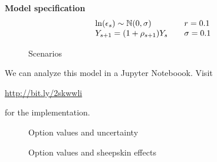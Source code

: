 \begin{frame}\textbf{Model specification}
\begin{align*}\begin{array}{l@{\qquad}l}
\ln(\epsilon_s) \sim \N(0, \sigma) & r = 0.1   \\
Y_{s + 1} = (1 + \rho_{s + 1}) Y_s & \sigma = 0.1 \\
\end{array}\end{align*}
\end{frame}
\begin{frame}
\begin{figure}[htp]\centering
\caption{Scenarios}
\end{figure}
\end{frame}
\begin{frame}
We can analyze this model in a Jupyter Noteboook. Visit
\begin{center}
\url{http://bit.ly/2skwwli}
\end{center}
for the implementation.
\end{frame}
\begin{frame}
\begin{figure}[htp]\centering
\caption{Option values and uncertainty}
\end{figure}
\end{frame}
\begin{frame}
\begin{figure}[htp]\centering
\caption{Option values and sheepskin effects}
\end{figure}
\end{frame}
